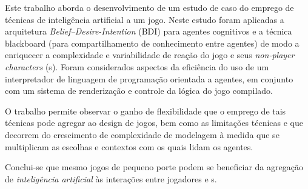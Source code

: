 Este trabalho aborda o desenvolvimento de um estudo de caso do emprego de técnicas de inteligência artificial a um jogo. Neste estudo foram aplicadas a arquitetura \emph{Belief--Desire-Intention} (BDI) para agentes cognitivos e a técnica blackboard (para compartilhamento de conhecimento entre agentes) de modo a enriquecer a complexidade e variabilidade de reação do jogo e seus \emph{non-player characters} (\npc{}s). Foram considerados aspectos da eficiência do uso de um interpretador de linguagem de programação orientada a agentes, em conjunto com um sistema de renderização e controle da lógica do jogo compilado.

O trabalho permite observar o ganho de flexibilidade que o emprego de tais técnicas pode agregar ao design de jogos, bem como as limitações técnicas e que decorrem do crescimento de complexidade de modelagem à medida que se multiplicam as escolhas e contextos com os quais lidam os agentes.

Conclui-se que mesmo jogos de pequeno porte podem se beneficiar da
agregação de \emph{inteligência artificial} às interações entre jogadores
e \npc{}s.


